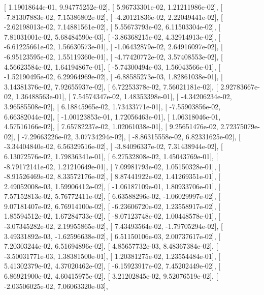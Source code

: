 \documentclass{article}
\begin{document}
       [  1.19018644e-01,   9.94775252e-02],
       [  5.96733301e-02,   1.21211986e-02],
       [ -7.81307883e-02,   7.15386802e-02],
       [ -4.20121836e-02,   2.22049441e-02],
       [ -2.62198013e-02,   7.14881561e-02],
       [  5.55673793e-02,   6.11503304e-02],
       [  7.81031001e-02,   5.68484590e-03],
       [ -3.86368215e-02,   4.32914913e-02],
       [ -6.61225661e-02,   1.56630573e-01],
       [ -1.06432879e-02,   2.64916097e-02],
       [ -6.95123595e-02,   1.55119360e-01],
       [ -4.77420772e-02,   3.57408553e-02],
       [  4.56623584e-02,   1.64194867e-01],
       [ -5.74300494e-03,   1.56043566e-01],
       [ -1.52190495e-02,   6.29964969e-02],
       [ -6.88585273e-03,   1.82861038e-01],
       [  3.14381376e-02,   7.92655937e-02],
       [  6.72253378e-02,   7.56021181e-02],
       [  2.92783667e-02,   1.36488563e-01],
       [  7.54574347e-02,   1.48353398e-01],
       [ -4.34206234e-02,   3.96585508e-02],
       [  6.18845965e-02,   1.73433771e-01],
       [ -7.55903856e-02,   6.66382044e-02],
       [ -1.00123853e-01,   1.72056463e-01],
       [  1.06318046e-01,   4.57516166e-02],
       [  7.65782237e-02,   1.02061038e-01],
       [  9.25651476e-02,   2.72375079e-02],
       [ -7.29663226e-02,   3.07734294e-02],
       [ -8.86315558e-02,   6.82331625e-02],
       [ -3.34404840e-02,   6.56329516e-02],
       [ -3.84096337e-02,   7.31438944e-02],
       [  6.13072576e-02,   1.79836341e-01],
       [  6.27532808e-02,   1.45043769e-01],
       [ -8.79172141e-02,   1.21210649e-01],
       [  7.09981793e-02,   1.05150328e-01],
       [ -8.91526469e-02,   8.33572176e-02],
       [  8.87441922e-02,   1.41269351e-01],
       [  2.49052008e-03,   1.59906412e-02],
       [ -1.06187109e-01,   1.80933706e-01],
       [  7.57152813e-02,   5.76772411e-02],
       [  6.63588296e-02,  -1.06029997e-02],
       [  9.07181407e-02,   6.76914100e-02],
       [ -6.23606720e-02,   1.23558917e-02],
       [  1.85594512e-02,   1.67284733e-02],
       [ -8.07123748e-02,   1.00448578e-01],
       [ -3.07345282e-02,   2.19955865e-02],
       [  7.43493564e-02,  -1.79705294e-02],
       [  3.49331892e-03,  -1.62596638e-02],
       [  6.51150106e-03,   2.00737617e-02],
       [  7.20303244e-02,   6.51694896e-02],
       [  4.85657732e-03,   8.48367384e-02],
       [ -3.50031771e-03,   1.38381500e-01],
       [  1.20381275e-02,   1.23554484e-01],
       [  5.41302379e-02,   4.37020462e-02],
       [ -6.15923917e-02,   7.45202449e-02],
       [  6.86921900e-02,   4.60415975e-02],
       [  3.21202845e-02,   9.52076519e-02],
       [ -2.03506025e-02,   7.06063320e-03],
\end{document}
